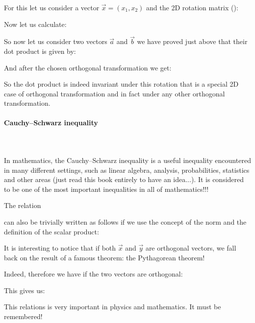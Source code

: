 	For this let us consider a vector $\vec{x}=(x_1,x_2)$ and the 2D rotation matrix ():
	
	Now let us calculate:
	
	So now let us consider two vectors $\vec{a}$ and $\vec{b}$ we have proved just above that their dot product is given by:
	
	And after the chosen orthogonal transformation we get:
	
	So the dot product is indeed invariant under this rotation that is a special 2D case of orthogonal transformation  and in fact under any other orthogonal transformation.		
	
	\pagebreak
	\paragraph{Cauchy–Schwarz inequality}\mbox{}\\\\
	In mathematics, the Cauchy–Schwarz inequality is a useful inequality encountered in many different settings, such as linear algebra, analysis, probabilities, statistics and other areas (just read this book entirely to have an idea...). It is considered to be one of the most important inequalities in all of mathematics!!!
	
	The relation
	
	 can also be trivially written as follows if we use the concept of the norm and the definition of the scalar product:
	 
	 It is interesting to notice that if both $\vec{x}$ and $\vec{y}$ are orthogonal vectors, we fall back on the result of a famous theorem: the Pythagorean theorem!

	Indeed, therefore we have if the two vectors are orthogonal:
	 
		This gives us:
	 
	This relations is very important in physics and mathematics. It must be remembered!
	 
